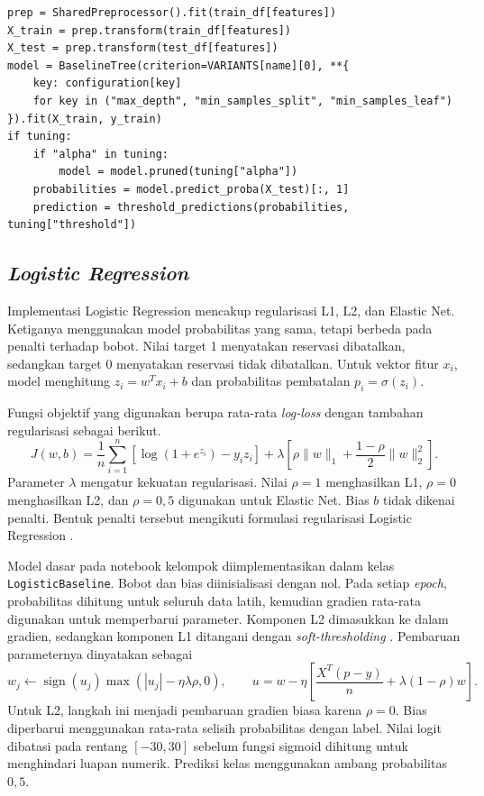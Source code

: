 \begin{lstlisting}[caption={Refit CART dan prediksi test data},label={lst-dtl-refit}]
prep = SharedPreprocessor().fit(train_df[features])
X_train = prep.transform(train_df[features])
X_test = prep.transform(test_df[features])
model = BaselineTree(criterion=VARIANTS[name][0], **{
    key: configuration[key]
    for key in ("max_depth", "min_samples_split", "min_samples_leaf")
}).fit(X_train, y_train)
if tuning:
    if "alpha" in tuning:
        model = model.pruned(tuning["alpha"])
    probabilities = model.predict_proba(X_test)[:, 1]
    prediction = threshold_predictions(probabilities, tuning["threshold"])
\end{lstlisting}

\subsection{\textit{Logistic Regression}}
\label{sec:implementasi-lr}

Implementasi Logistic Regression mencakup regularisasi L1, L2, dan Elastic Net. Ketiganya menggunakan model probabilitas yang sama, tetapi berbeda pada penalti terhadap bobot. Nilai target 1 menyatakan reservasi dibatalkan, sedangkan target 0 menyatakan reservasi tidak dibatalkan. Untuk vektor fitur $x_i$, model menghitung $z_i=w^T x_i+b$ dan probabilitas pembatalan $p_i=\sigma(z_i)$.

Fungsi objektif yang digunakan berupa rata-rata \textit{log-loss} dengan tambahan regularisasi sebagai berikut.
\begin{equation}
    J(w,b)=\frac{1}{n}\sum_{i=1}^{n}\left[\log(1+e^{z_i})-y_i z_i\right]
    +\lambda\left[\rho\lVert w\rVert_1+\frac{1-\rho}{2}\lVert w\rVert_2^2\right].
    \label{eq:lr-objective}
\end{equation}
Parameter $\lambda$ mengatur kekuatan regularisasi. Nilai $\rho=1$ menghasilkan L1, $\rho=0$ menghasilkan L2, dan $\rho=0{,}5$ digunakan untuk Elastic Net. Bias $b$ tidak dikenai penalti. Bentuk penalti tersebut mengikuti formulasi regularisasi Logistic Regression \cite{scikitlearn_logistic}.

Model dasar pada notebook kelompok diimplementasikan dalam kelas \texttt{LogisticBaseline}. Bobot dan bias diinisialisasi dengan nol. Pada setiap \textit{epoch}, probabilitas dihitung untuk seluruh data latih, kemudian gradien rata-rata digunakan untuk memperbarui parameter. Komponen L2 dimasukkan ke dalam gradien, sedangkan komponen L1 ditangani dengan \textit{soft-thresholding} \cite{parikh2014proximal}. Pembaruan parameternya dinyatakan sebagai
\begin{equation}
    w_j\leftarrow\operatorname{sign}(u_j)\max\left(|u_j|-\eta\lambda\rho,0\right),
    \qquad
    u=w-\eta\left[\frac{X^T(p-y)}{n}+\lambda(1-\rho)w\right].
\end{equation}
Untuk L2, langkah ini menjadi pembaruan gradien biasa karena $\rho=0$. Bias diperbarui menggunakan rata-rata selisih probabilitas dengan label. Nilai logit dibatasi pada rentang $[-30,30]$ sebelum fungsi sigmoid dihitung untuk menghindari luapan numerik. Prediksi kelas menggunakan ambang probabilitas $0{,}5$.


